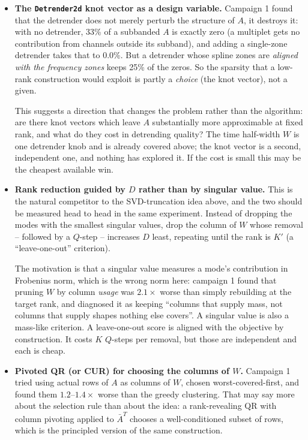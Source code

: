 \documentclass{article}
\numberwithin{equation}{section}   %
\begin{document}
\begin{itemize}

\item {\bf The {\tt Detrender2d} knot vector as a design variable.}
 Campaign 1 found that the detrender does not merely perturb the structure of $A$, it
 destroys it: with no detrender, 33\% of a subbanded $A$ is exactly zero (a multiplet gets
 no contribution from channels outside its subband), and adding a single-zone detrender
 takes that to 0.0\%. But a detrender whose spline zones are {\em aligned with the frequency
 zones} keeps 25\% of the zeros. So the sparsity that a low-rank construction would exploit
 is partly a {\em choice} (the knot vector), not a given.

 This suggests a direction that changes the problem rather than the algorithm: are there
 knot vectors which leave $A$ substantially more approximable at fixed rank, and what do
 they cost in detrending quality? The time half-width $W$ is one detrender knob and is
 already covered above; the knot vector is a second, independent one, and nothing has
 explored it. If the cost is small this may be the cheapest available win.

\item {\bf Rank reduction guided by $D$ rather than by singular value.}
 This is the natural competitor to the SVD-truncation idea above, and the two should be
 measured head to head in the same experiment. Instead of dropping the modes with the
 smallest singular values, drop the column of $W$ whose removal -- followed by a $Q$-step --
 increases $D$ least, repeating until the rank is $K'$ (a ``leave-one-out'' criterion).

 The motivation is that a singular value measures a mode's contribution in Frobenius norm,
 which is the wrong norm here: campaign 1 found that pruning $W$ by column {\em
 usage} was $2.1\times$ worse than simply rebuilding at the target rank, and diagnosed it as
 keeping ``columns that supply mass, not columns that supply shapes nothing else covers''.
 A singular value is also a mass-like criterion. A leave-one-out score is aligned with the
 objective by construction. It costs $K$ $Q$-steps per removal, but those are independent
 and each is cheap.

\item {\bf Pivoted QR (or CUR) for choosing the columns of $W$.}
 Campaign 1 tried using actual rows of $A$ as columns of $W$, chosen worst-covered-first,
 and found them $1.2$--$1.4\times$ worse than the greedy clustering. That may say more about
 the selection rule than about the idea: a rank-revealing QR with column pivoting applied to
 $\bar A^T$ chooses a well-conditioned subset of rows, which is the principled version of
 the same construction.


\end{itemize}
\end{document}

